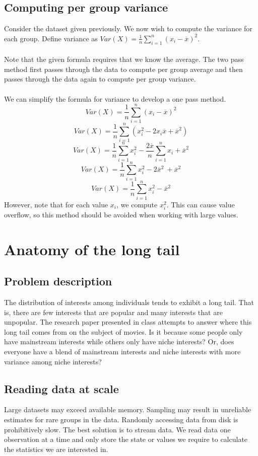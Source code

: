 \subsection{Computing per group variance}
Consider the dataset given previously. We now wish to compute the variance for each group. Define variance as $Var(X) = \frac{1}{n} \sum_{i=1}^n (x_i - \overline{x})^2$.\\\\
Note that the given formula requires that we know the average. The two pass method first passes through the data to compute per group average and then passes through the data again to compute per group variance.\\\\
We can simplify the formula for variance to develop a one pass method.
$$Var(X) = \frac{1}{n}\sum_{i=1}^n(x_i - \overline{x})^2$$
$$Var(X) = \frac{1}{n}\sum_{i=1}^n(x_i^2 - 2x_i\overline{x} + \overline{x}^2)$$
$$Var(X) = \frac{1}{n}\sum_{i=1}^nx_i^2 - \frac{2\overline{x}}{n}\sum_{i=1}^n x_i + \overline{x}^2$$
$$Var(X) = \frac{1}{n}\sum_{i=1}^nx_i^2 - 2\overline{x}^2\ + \overline{x}^2$$
$$Var(X) = \frac{1}{n}\sum_{i=1}^nx_i^2 - \overline{x}^2$$
However, note that for each value $x_i$, we compute $x_i^2$. This can cause value overflow, so this method should be avoided when working with large values.

\section{Anatomy of the long tail}
\subsection{Problem description}
The distribution of interests among individuals tends to exhibit a long tail. That is, there are few interests that are popular and many interests that are unpopular. The research paper presented in class attempts to answer where this long tail comes from on the subject of movies. Is it because some people only have mainstream interests while others only have niche interests? Or, does everyone have a blend of mainstream interests and niche interests with more variance among niche interests?

\subsection{Reading data at scale}
Large datasets may exceed available memory. Sampling may result in unreliable estimates for rare groups in the data. Randomly accessing data from disk is prohibitively slow. The best solution is to stream data. We read data one observation at a time and only store the state or values we require to calculate the statistics we are interested in.

